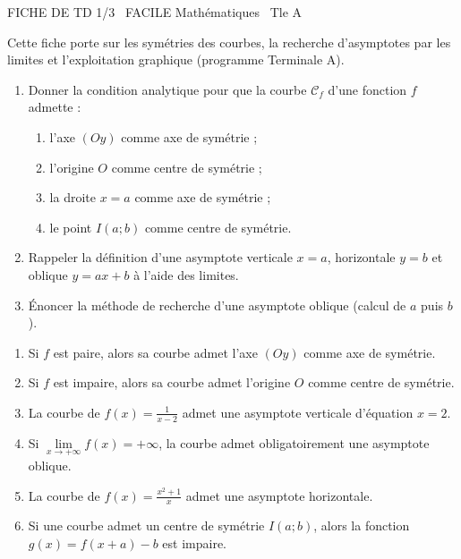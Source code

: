 \documentclass[11pt]{article}
\begin{document}
\begin{tcolorbox}[enhanced,colback=popink,colframe=popink,arc=10pt,boxrule=0pt,left=12pt,right=12pt,top=9pt,bottom=9pt]
{\color{white}\popxbold\small FICHE DE TD 1/3 \textbullet\ FACILE \hfill Mathématiques \textbullet\ Tle A\par}
\end{tcolorbox}
\vspace{4pt}
\noindent Cette fiche porte sur les symétries des courbes, la recherche d'asymptotes par les limites et l'exploitation graphique (programme Terminale A).

\begin{exercice}
\begin{enumerate}
    \item Donner la condition analytique pour que la courbe $\mathcal{C}_f$ d'une fonction $f$ admette :
    \begin{enumerate}
        \item l'axe $(Oy)$ comme axe de symétrie ;
        \item l'origine $O$ comme centre de symétrie ;
        \item la droite $x = a$ comme axe de symétrie ;
        \item le point $I(a;b)$ comme centre de symétrie.
    \end{enumerate}
    \item Rappeler la définition d'une asymptote verticale $x = a$, horizontale $y = b$ et oblique $y = ax + b$ à l'aide des limites.
    \item Énoncer la méthode de recherche d'une asymptote oblique (calcul de $a$ puis $b$).
\end{enumerate}
\end{exercice}

\begin{exercice}
\begin{enumerate}
    \item Si $f$ est paire, alors sa courbe admet l'axe $(Oy)$ comme axe de symétrie.
    \item Si $f$ est impaire, alors sa courbe admet l'origine $O$ comme centre de symétrie.
    \item La courbe de $f(x) = \frac{1}{x-2}$ admet une asymptote verticale d'équation $x = 2$.
    \item Si $\lim\limits_{x \to +\infty} f(x) = +\infty$, la courbe admet obligatoirement une asymptote oblique.
    \item La courbe de $f(x) = \frac{x^2+1}{x}$ admet une asymptote horizontale.
    \item Si une courbe admet un centre de symétrie $I(a;b)$, alors la fonction $g(x) = f(x+a)-b$ est impaire.
\end{enumerate}
\end{exercice}
\end{document}
